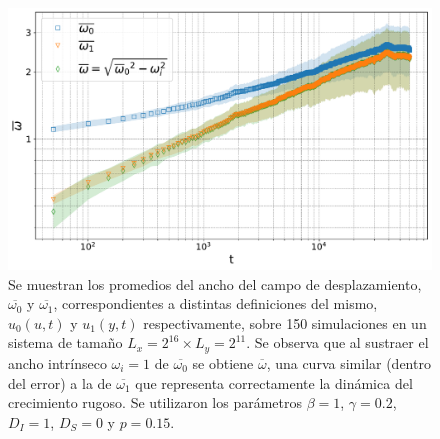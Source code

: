 \begin{figure}[t]
    \centering
    \includegraphics[width=\imsizeL]{omegas.pdf}
    \caption{Se muestran los promedios del ancho del campo de desplazamiento, $\overline{\omega_0}$ y $\overline{\omega_1}$, correspondientes a distintas definiciones del mismo, $u_0(u,t)$ y $u_1(y,t)$ respectivamente, sobre 150 simulaciones en un sistema de tamaño $L_x = 2^{16} \times L_y = 2^{11}$. Se observa que al sustraer el ancho intrínseco $\omega_i = 1$ de $\overline{\omega_0}$ se obtiene $\overline{\omega}$, una curva similar (dentro del error) a la de $\overline{\omega_1}$ que representa correctamente la dinámica del crecimiento rugoso. Se utilizaron los parámetros $\beta = 1$, $\gamma = 0.2$, $D_I = 1$, $D_S = 0$ y $p=0.15$.}  
    \label{fig:omegas}
\end{figure}



